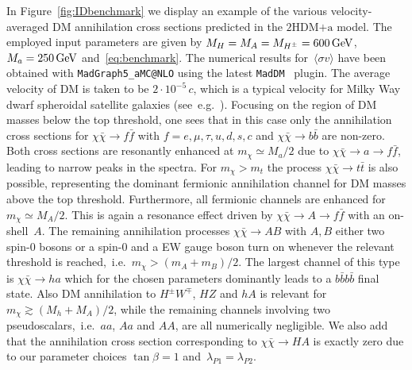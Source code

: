 \documentclass[a4paper, 11pt,notoc]{article}
\newcommand{\hdma}{\ensuremath{\textrm{2HDM+a}}\xspace}
\begin{document}
In Figure~\ref{fig:IDbenchmark} we display  an example of the various velocity-averaged DM annihilation cross sections predicted  in the \hdma model. The employed input parameters are given by $M_H = M_A = M_{H^\pm} = 600 \, {\rm GeV}$, $M_a = 250 \, {\rm GeV}$ and~\eqref{eq:benchmark}. The numerical results for~$\langle \sigma v \rangle$ have been obtained with {\tt MadGraph5\_aMC@NLO}  using the latest  {\tt MadDM}~\cite{Ambrogi:2018jqj} plugin.  The average velocity of DM is taken to be $2 \cdot 10^{-5} \, c$, which is a typical velocity for Milky Way dwarf spheroidal satellite galaxies (see~e.g.~\cite{Simon:2007dq,Walker:2008ax}). Focusing on the region of DM masses below the top threshold, one sees that in this case only the annihilation cross sections for $\chi \bar \chi \to f \bar f$ with $f = e, \mu, \tau, u, d, s, c$ and $\chi \bar \chi \to b \bar b$ are non-zero.  Both cross sections are resonantly enhanced at $m_\chi \simeq M_a/2$ due to $\chi \bar \chi \to a \to f \bar f$, leading to narrow peaks in the spectra. For $m_\chi > m_t$ the process $\chi \bar \chi \to t \bar t$ is also possible, representing the dominant fermionic annihilation channel for DM masses above the top threshold. Furthermore, all fermionic channels are enhanced for $m_\chi \simeq M_A/2$. This is again a resonance effect driven  by $\chi \bar \chi \to A \to f \bar f$ with an on-shell~$A$. The remaining annihilation processes $\chi \bar \chi \to A B$ with $A,B$ either  two spin-0 bosons or a spin-0 and a EW gauge boson turn on whenever the relevant threshold is reached,~i.e.~$m_\chi > (m_A + m_B)/2$. The largest channel of this type is $\chi \bar \chi \to ha$ which for the chosen parameters dominantly leads to a $b \bar b b \bar b$ final state. Also DM annihilation to  $H^\pm W^\mp$, $HZ$ and $hA$ is relevant for $m_\chi \gtrsim (M_h + M_A)/2$, while the remaining channels involving two pseudoscalars,~i.e.~$aa$, $Aa$ and $AA$, are all numerically negligible. We also add that the annihilation cross section corresponding to $\chi \bar \chi \to HA$ is exactly zero due to our parameter choices  $\tan \beta = 1$ and~$\lambda_{P1} = \lambda_{P2}$.  
\end{document}
